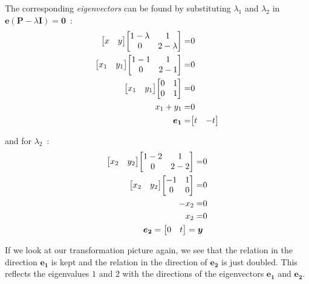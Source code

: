 \documentclass[11pt,twocolumn]{amsart} %
\newcommand{\ve}[1]{\boldsymbol{#1}}
\newcommand{\ma}[1]{\boldsymbol{#1}}
\newenvironment{m}{\begin{bmatrix}}{\end{bmatrix}}
\begin{document}
The corresponding \emph{eigenvectors} can be found by substituting $\lambda_1$ and $\lambda_2$ in $\ve{e} (\ma{P} - \lambda \ma{I}) = \ve{0}$~:
\begin{align*}
  \begin{m} x & y \end{m} \begin{m} 1-\lambda & 1 \\ 0 & 2-\lambda \end{m} = & 0 \\
  \begin{m} x_1 & y_1 \end{m} \begin{m} 1-1 & 1 \\ 0 & 2-1 \end{m} = & 0 \\
  \begin{m} x_1 & y_1 \end{m} \begin{m} 0 & 1 \\ 0 & 1 \end{m} = & 0 \\
  x_1 + y_1 = & 0 \\
  \ve{e_1} = & \begin{m} t & -t \end{m}
\end{align*}

and for $\lambda_2$~:
\begin{align*}
  \begin{m} x_2 & y_2 \end{m} \begin{m} 1-2 & 1 \\ 0 & 2-2 \end{m} = & 0 \\
  \begin{m} x_2 & y_2 \end{m} \begin{m} -1 & 1 \\ 0 & 0 \end{m} = & 0 \\
  -x_2  = & 0 \\
   x_2  = & 0 \\
  \ve{e_2} = \begin{m} 0 & t \end{m} = \ve{y}
\end{align*}

If we look at our transformation picture again, we see that the relation in the direction $\ve{e_1}$ is kept and the relation in the direction of $\ve{e_2}$ is just doubled. This reflects the eigenvalues $1$ and $2$ with the directions of the eigenvectors $\ve{e_1}$ and $\ve{e_2}$.
\end{document}
